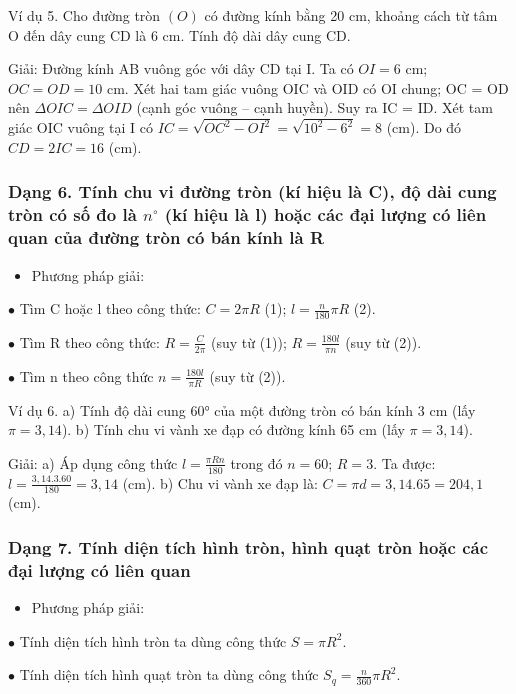 \documentclass[%
    fontsize=12pt,%
    chapterprefix=false,%
    open=right,%
    twoside=false,%
    numbers=noenddot,%
    headings=optiontohead,%
    final,%
    DIV=15,%
    parskip=half %
]{scrbook}
\begin{document}

Ví dụ 5. Cho đường tròn $(O)$ có đường kính bằng 20 cm, khoảng cách từ tâm O đến dây cung CD là 6 cm. Tính độ dài dây cung CD.

Giải: Đường kính AB vuông góc với dây CD tại I. Ta có $OI = 6$ cm; $OC = OD = 10$ cm. Xét hai tam giác vuông OIC và OID có OI chung; OC = OD nên $\Delta OIC = \Delta OID$ (cạnh góc vuông -- cạnh huyền). Suy ra IC = ID. Xét tam giác OIC vuông tại I có $IC = \sqrt{OC^2 - OI^2} = \sqrt{10^2 - 6^2} = 8$ (cm). Do đó $CD = 2IC = 16$ (cm).
\subsubsection{Dạng 6. Tính chu vi đường tròn (kí hiệu là C), độ dài cung tròn có số đo là $n^\circ$ (kí hiệu là l) hoặc các đại lượng có liên quan của đường tròn có bán kính là R}

\begin{itemize}
  \item Phương pháp giải:
\end{itemize}

$\bullet$ Tìm C hoặc l theo công thức: $C = 2\pi R$ (1); $l = \frac{n}{180}\pi R$ (2).

$\bullet$ Tìm R theo công thức: $R = \frac{C}{2\pi}$ (suy từ (1)); $R = \frac{180l}{\pi n}$ (suy từ (2)).

$\bullet$ Tìm n theo công thức $n = \frac{180l}{\pi R}$ (suy từ (2)).

Ví dụ 6. a) Tính độ dài cung 60° của một đường tròn có bán kính 3 cm (lấy $\pi = 3,14$). b) Tính chu vi vành xe đạp có đường kính 65 cm (lấy $\pi = 3,14$).

Giải: a) Áp dụng công thức $l = \frac{\pi Rn}{180}$ trong đó $n = 60$; $R = 3$. Ta được: $l = \frac{3,14.3.60}{180} = 3,14$ (cm). b) Chu vi vành xe đạp là: $C = \pi d = 3,14.65 = 204,1$ (cm).
\subsubsection{Dạng 7. Tính diện tích hình tròn, hình quạt tròn hoặc các đại lượng có liên quan}

\begin{itemize}
  \item Phương pháp giải:
\end{itemize}

$\bullet$ Tính diện tích hình tròn ta dùng công thức $S = \pi R^2$.

$\bullet$ Tính diện tích hình quạt tròn ta dùng công thức $S_q = \frac{n}{360}\pi R^2$.
\end{document}
